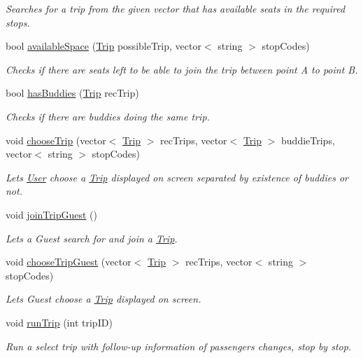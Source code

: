 \begin{Indent}
\begin{DoxyCompactItemize}
\begin{DoxyCompactList}\small\item\em Searches for a trip from the given vector that has available seats in the required stops. \end{DoxyCompactList}\item 
bool \hyperlink{class_agency_a9defb73f53ce32bc6382843dd46fc464}{available\+Space} (\hyperlink{class_trip}{Trip} possible\+Trip, vector$<$ string $>$ stop\+Codes)
\begin{DoxyCompactList}\small\item\em Checks if there are seats left to be able to join the trip between point A to point B. \end{DoxyCompactList}\item 
bool \hyperlink{class_agency_aa7fe817661a5e46322db9e809ac54fe9}{has\+Buddies} (\hyperlink{class_trip}{Trip} rec\+Trip)
\begin{DoxyCompactList}\small\item\em Checks if there are buddies doing the same trip. \end{DoxyCompactList}\item 
void \hyperlink{class_agency_ab93c48db5700b6d02bf81b3cd3af6711}{choose\+Trip} (vector$<$ \hyperlink{class_trip}{Trip} $>$ rec\+Trips, vector$<$ \hyperlink{class_trip}{Trip} $>$ buddie\+Trips, vector$<$ string $>$ stop\+Codes)
\begin{DoxyCompactList}\small\item\em Lets \hyperlink{class_user}{User} choose a \hyperlink{class_trip}{Trip} displayed on screen separated by existence of buddies or not. \end{DoxyCompactList}\item 
\mbox{\label{class_agency_a5a21d06cf7fd4cae84b69554555f229e}} 
void \hyperlink{class_agency_a5a21d06cf7fd4cae84b69554555f229e}{join\+Trip\+Guest} ()
\begin{DoxyCompactList}\small\item\em Lets a Guest search for and join a \hyperlink{class_trip}{Trip}. \end{DoxyCompactList}\item 
void \hyperlink{class_agency_a7e9a9bafaab57a8e9a5963302b7401ff}{choose\+Trip\+Guest} (vector$<$ \hyperlink{class_trip}{Trip} $>$ rec\+Trips, vector$<$ string $>$ stop\+Codes)
\begin{DoxyCompactList}\small\item\em Lets Guest choose a \hyperlink{class_trip}{Trip} displayed on screen. \end{DoxyCompactList}\item 
void \hyperlink{class_agency_a76d5990291e33a194a46c390986a668b}{run\+Trip} (int trip\+ID)
\begin{DoxyCompactList}\small\item\em Run a select trip with follow-\/up information of passengers changes, stop by stop. \end{DoxyCompactList}\end{DoxyCompactItemize}
\end{Indent}
